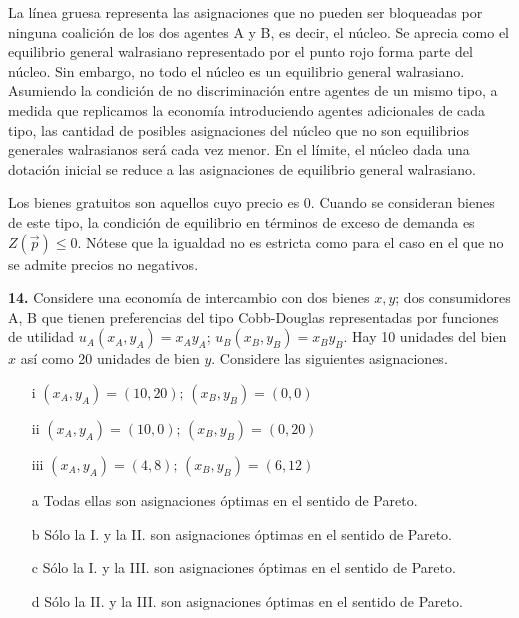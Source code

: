 \documentclass{nuevotema}
\begin{document}
La línea gruesa representa las asignaciones que no pueden ser bloqueadas por ninguna coalición de los dos agentes A y B, es decir, el núcleo. Se aprecia como el equilibrio general walrasiano representado por el punto rojo forma parte del núcleo. Sin embargo, no todo el núcleo es un equilibrio general walrasiano. Asumiendo la condición de no discriminación entre agentes de un mismo tipo, a medida que replicamos la economía introduciendo agentes adicionales de cada tipo, las cantidad de posibles asignaciones del núcleo que no son equilibrios generales walrasianos será cada vez menor. En el límite, el núcleo dada una dotación inicial se reduce a las asignaciones de equilibrio general walrasiano. 

\conceptos 


Los bienes gratuitos son aquellos cuyo precio es 0. Cuando se consideran bienes de este tipo, la condición de equilibrio en términos de exceso de demanda es $Z(\vec{p}) \leq 0$. Nótese que la igualdad no es estricta como para el caso en el que no se admite precios no negativos.

\preguntas


\textbf{14.} Considere una economía de intercambio con dos bienes $x, y$; dos consumidores A, B que tienen preferencias del tipo Cobb-Douglas representadas por funciones de utilidad $u_A(x_A, y_A) = x_A y_A$; $u_B(x_B, y_B) = x_B y_B$. Hay 10 unidades del bien $x$ así como 20 unidades de bien $y$. Considere las siguientes asignaciones.

\begin{itemize}
	\item[i] $(x_A, y_A) = (10,20); \, (x_B, y_B) = (0,0)$
	\item[ii] $(x_A, y_A) = (10,0); \, (x_B, y_B) = (0,20)$
	\item[iii] $(x_A, y_A) = (4,8); \, (x_B, y_B) = (6,12)$
\end{itemize}

\begin{itemize}
	\item[a] Todas ellas son asignaciones óptimas en el sentido de Pareto.
	\item[b] Sólo la I. y la II. son asignaciones óptimas en el sentido de Pareto.
	\item[c] Sólo la I. y la III. son asignaciones óptimas en el sentido de Pareto.
	\item[d] Sólo la II. y la III. son asignaciones óptimas en el sentido de Pareto.
\end{itemize}
\end{document}
